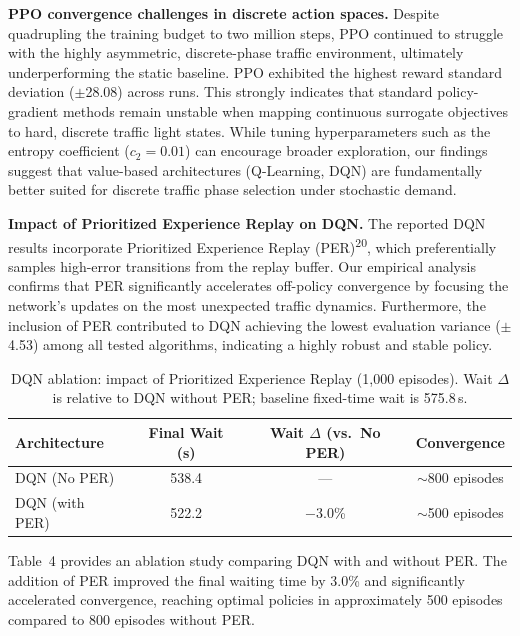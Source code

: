 \documentclass[10pt,a4paper]{article}
\begin{document}
\textbf{PPO convergence challenges in discrete action spaces.}
Despite quadrupling the training budget to two million steps, PPO continued to struggle with the highly asymmetric, discrete-phase traffic environment, ultimately underperforming the static baseline. PPO exhibited the highest reward standard deviation ($\pm$28.08) across runs. This strongly indicates that standard policy-gradient methods remain unstable when mapping continuous surrogate objectives to hard, discrete traffic light states. While tuning hyperparameters such as the entropy coefficient ($c_2 = 0.01$) can encourage broader exploration, our findings suggest that value-based architectures (Q-Learning, DQN) are fundamentally better suited for discrete traffic phase selection under stochastic demand.

\textbf{Impact of Prioritized Experience Replay on DQN.}
The reported DQN results incorporate Prioritized Experience Replay (PER)\textsuperscript{20}, which preferentially samples high-error transitions from the replay buffer. Our empirical analysis confirms that PER significantly accelerates off-policy convergence by focusing the network's updates on the most unexpected traffic dynamics. Furthermore, the inclusion of PER contributed to DQN achieving the lowest evaluation variance ($\pm$4.53) among all tested algorithms, indicating a highly robust and stable policy.

\begin{table}[H]
\centering
\caption{DQN ablation: impact of Prioritized Experience Replay (1,000 episodes). Wait $\Delta$ is relative to DQN without PER; baseline fixed-time wait is 575.8\,s.}
\vspace{0.5em}
\begin{tabular}{l c c c}
\toprule
\textbf{Architecture} & \textbf{Final Wait (s)} & \textbf{Wait $\Delta$ (vs.\ No PER)} & \textbf{Convergence} \\
\midrule
DQN (No PER)   & 538.4 & ---     & $\sim$800 episodes \\
DQN (with PER) & 522.2 & $-$3.0\% & $\sim$500 episodes \\
\bottomrule
\end{tabular}
\label{tab:ablation}
\end{table}

Table~4 provides an ablation study comparing DQN with and without PER. The addition of PER improved the final waiting time by 3.0\% and significantly accelerated convergence, reaching optimal policies in approximately 500 episodes compared to 800 episodes without PER.
\end{document}
